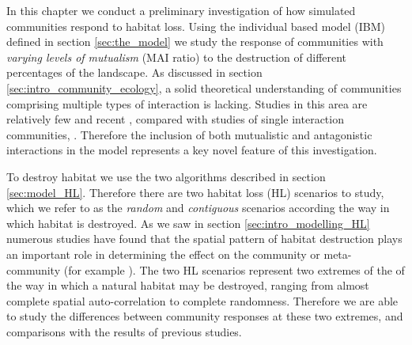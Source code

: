 In this chapter we conduct a preliminary investigation of how simulated communities respond to habitat loss. Using the individual based model (IBM) defined in section \ref{sec:the_model} we study the response of communities with \emph{varying levels of mutualism} (MAI ratio) to the destruction of different percentages of the landscape. As discussed in section \ref{sec:intro_community_ecology}, a solid theoretical understanding of communities comprising multiple types of interaction is lacking. Studies in this area are relatively few and recent \cite{sauve2014structure,fontaine2011ecological,kefi2012more,pocock2012robustness,mougi2012diversity,evans2013robustness}, compared with studies of single interaction communities, . Therefore the inclusion of both mutualistic and antagonistic interactions in the model represents a key novel feature of this investigation.  

To destroy habitat we use the two algorithms described in section \ref{sec:model_HL}. Therefore there are two habitat loss (HL) scenarios to study, which we refer to as the \emph{random} and \emph{contiguous} scenarios according the way in which habitat is destroyed. As we saw in section \ref{sec:intro_modelling_HL} numerous studies have found that the spatial pattern of habitat destruction plays an important role in determining the effect on the community or meta-community (for example \cite{ovaskainen2002metapopulation,jager2006simulated,sole2006ecological}). The two HL scenarios represent two extremes of the of the way in which a natural habitat may be destroyed, ranging from almost complete spatial auto-correlation to complete randomness. Therefore we are able to study the differences between community responses at these two extremes, and  comparisons with the results of previous studies.

